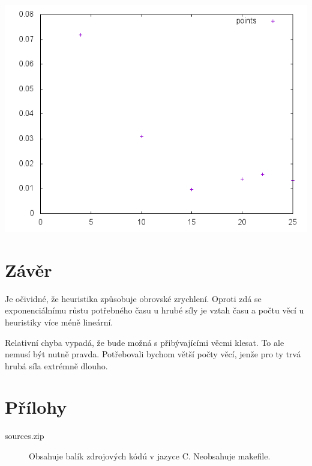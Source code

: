 \documentclass[12pt,a4paper]{article}
\begin{document}
\begin{center}
\includegraphics[width=\textwidth]{simpleheur_relerr}
\end{center}




\section{Závěr}

Je očividné, že heuristika způsobuje obrovské zrychlení. Oproti zdá se exponenciálnímu růstu potřebného času
u hrubé síly je vztah času a počtu věcí u heuristiky více méně lineární.

Relativní chyba vypadá, že bude možná s přibývajícími věcmi klesat. To ale nemusí být nutně pravda. Potřebovali bychom
větší počty věcí, jenže pro ty trvá hrubá síla extrémně dlouho.

\section{Přílohy}

\begin{description}
\item[sources.zip] Obsahuje balík zdrojových kódú v jazyce C. Neobsahuje makefile.
\end{description}
\end{document}
